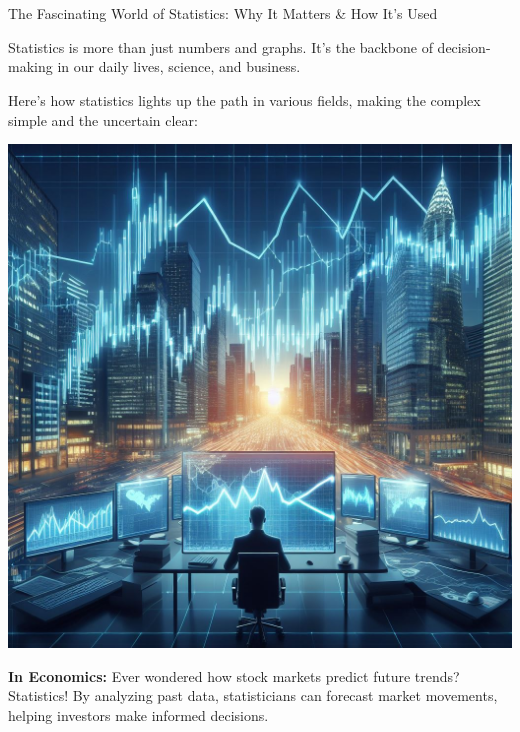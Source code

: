 \documentclass[final]{beamer}
\begin{document}
\begin{frame}[t]{}
\begin{columns}[t]
\begin{column}{.33\textwidth}
\begin{block}{}
				\normalsize \insertauthor\\

				\vspace{1cm}

				\small \textit{\insertinstitute}\\

				\vspace{1cm}

			\end{block}

			\vspace{0.5cm}

			\begin{block}{The Fascinating World of Statistics: Why It Matters \& How It's Used}

				Statistics is more than just numbers and graphs. It's the backbone of decision-making in our daily lives, science, and business.

				\vspace{0.5cm}

				Here's how statistics lights up the path in various fields, making the complex simple and the uncertain clear:

				\vspace{1cm}

				\begin{minipage}{0.3\textwidth}
					\centering
					\includegraphics[width=0.88\linewidth]{./images/2-2-1-StockMarket.jpeg}
				\end{minipage}
				\hfill
				\begin{minipage}{0.68\textwidth}
					\textbf{In Economics:} Ever wondered how stock markets predict future trends? Statistics! By analyzing past data, statisticians can forecast market movements, helping investors make informed decisions.
				\end{minipage}


\end{block}
\end{column}
\end{columns}
\end{frame}
\end{document}
